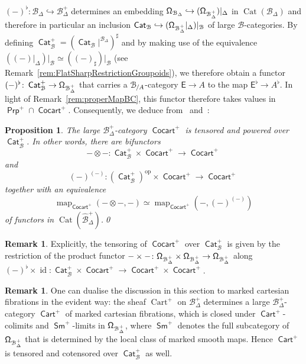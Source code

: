 \documentclass[reqno]{amsart}
\numberwithin{equation}{subsection}
\theoremstyle{plain}
\newtheorem{proposition}[equation]{Proposition}
\theoremstyle{definition}
\newtheorem{remark}[equation]{Remark}
\let\scr=\mathcal
\let\into=\hookrightarrow
\def\BB{\scr B}
\def\BBB{\widehat{\BB}}
\DeclareMathOperator{\id}{id}
\DeclareMathOperator{\Cat}{Cat}
\DeclareMathOperator{\ICat}{\mathsf{Cat}}
\DeclareMathOperator{\Cart}{Cart}
\DeclareMathOperator{\ICocart}{\mathsf{Cocart}}
\DeclareMathOperator{\ICart}{\mathsf{Cart}}
\DeclareMathOperator{\Map}{map}
\DeclareMathOperator{\IProp}{\mathsf{Prp}}
\DeclareMathOperator{\mSmooth}{\mathsf{Sm}}
\newcommand{\op}{\mathrm{op}}
\newcommand{\map}[1]{\Map_{#1}}
\newcommand{\Over}[2]{#1_{\hspace{-1pt}/#2}}
\newcommand{\I}[1]{\mathsf{#1}}
\newcommand{\Simp}[1]{#1_{\Delta}}
\newcommand{\mSimp}[1]{#1_{\Delta}^+}
\begin{document}
$(-)^\flat\colon \Simp\BB\into\mSimp\BB$ determines an embedding $\Univ[\Simp\BB]\into (\Univ[\mSimp\BB])\vert_{\Delta}$ in $\Cat(\Simp\BB)$ and therefore in particular an inclusion $\ICat_{\BB}\into( \Univ[\mSimp\BB]\vert_{\Delta})\vert_{\BB}$ of large $\BB$-categories. By defining  $\ICat_{\BB}^+=(\ICat_{\BB}\vert^{\Simp\BB})^\sharp$ and by making use of the equivalence $((-)\vert_{\Delta})\vert_{\BB}\simeq ((-)_\sharp)\vert_{\BB}$ (see Remark~\ref{rem:FlatSharpRestrictionGroupoids}), we therefore obtain a functor $(-)^\flat\colon\ICat_{\BB}^+\to\Univ[\mSimp\BB]$ that carries a $\Over{\BB}{A}$-category $\I{E}\to A$ to the map $\I{E}^\flat\to A^\flat$. In light of Remark~\ref{rem:properMapBC}, this functor therefore takes values in $\IProp^+\cap\ICocart^+$. 
Consequently, we deduce from~\cite[Proposition~7.3.6]{Martini2021a} and~\cite[Remark~7.3.7]{Martini2021a}:
\begin{proposition}
	\label{prop:Cocart+TensoredPowered}
	The large $\mSimp\BB$-category $\ICocart^+$ is tensored and powered over $\ICat_{\BB}^+$. In other words, there are bifunctors
	\begin{equation*}
	-\otimes -\colon \ICat_{\BB}^+\times \ICocart^+\to\ICocart^+
	\end{equation*}
	and
	\begin{equation*}
	(-)^{(-)}\colon(\ICat_{\BB}^+)^{\op}\times\ICocart^+\to\ICocart^+
	\end{equation*}
	together with an equivalence
	\begin{equation*}
	\map{\ICocart^+}(-\otimes -,-)\simeq\map{\ICocart^+}(-, (-)^{(-)})
	\end{equation*}
	of functors in $\Cat(\mSimp\BBB)$.\qed
\end{proposition}
\begin{remark}
	\label{rem:tensoringPoweringCocart+Explicitly}
	Explicitly, the tensoring of $\ICocart^+$ over $\ICat_{\BB}^+$ is given by the restriction of the product functor $-\times -\colon \Univ[\mSimp\BB]\times\Univ[\mSimp\BB]\to\Univ[\mSimp\BB]$ along $(-)^\flat\times\id\colon\ICat_{\BB}^+\times\ICocart^+\to\ICocart^+\times\ICocart^+$.
\end{remark}

\begin{remark}
	\label{rem:Cart+}
	One can dualise the discussion in this section to marked cartesian fibrations in the evident way: the sheaf $\Cart^+$ on $\mSimp\BB$ determines a large $\mSimp\BB$-category $\ICart^+$ of marked cartesian fibrations, which is closed under $\ICart^+$-colimits and $\mSmooth^+$-limits in $\Univ[\mSimp\BB]$, where $\mSmooth^+$ denotes the full subcategory of $\Univ[\mSimp\BB]$ that is determined by the local class of marked smooth maps. Hence $\ICart^+$ is tensored and cotensored over $\ICat_{\BB}^+$ as well.
\end{remark}
\end{document}
